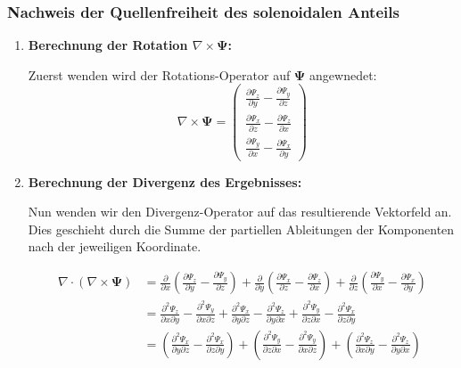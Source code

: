 \subsubsection{Nachweis der Quellenfreiheit des solenoidalen Anteils}

\begin{enumerate}
    \item \textbf{Berechnung der Rotation $\nabla \times \mathbf{\Psi}$:}
    
    Zuerst wenden wird der Rotations-Operator auf $\mathbf{\Psi}$ angewnedet:
    \[
    \nabla \times \mathbf{\Psi} =
    \begin{pmatrix}
        \frac{\partial \Psi_z}{\partial y} - \frac{\partial \Psi_y}{\partial z} \\
        \frac{\partial \Psi_x}{\partial z} - \frac{\partial \Psi_z}{\partial x} \\
        \frac{\partial \Psi_y}{\partial x} - \frac{\partial \Psi_x}{\partial y}
    \end{pmatrix}
    \]

    \item \textbf{Berechnung der Divergenz des Ergebnisses:}
    
    Nun wenden wir den Divergenz-Operator auf das resultierende Vektorfeld an. Dies geschieht durch die Summe der partiellen Ableitungen der Komponenten nach der jeweiligen Koordinate.
    
    \begin{align*}
    \nabla \cdot (\nabla \times \mathbf{\Psi}) &= \frac{\partial}{\partial x}\left( \frac{\partial \Psi_z}{\partial y} - \frac{\partial \Psi_y}{\partial z} \right) + \frac{\partial}{\partial y}\left( \frac{\partial \Psi_x}{\partial z} - \frac{\partial \Psi_z}{\partial x} \right) + \frac{\partial}{\partial z}\left( \frac{\partial \Psi_y}{\partial x} - \frac{\partial \Psi_x}{\partial y} \right) \\[1em]
    &= \frac{\partial^2 \Psi_z}{\partial x \partial y} - \frac{\partial^2 \Psi_y}{\partial x \partial z} + \frac{\partial^2 \Psi_x}{\partial y \partial z} - \frac{\partial^2 \Psi_z}{\partial y \partial x} + \frac{\partial^2 \Psi_y}{\partial z \partial x} - \frac{\partial^2 \Psi_x}{\partial z \partial y} \\[1em]
    &= \left( \frac{\partial^2 \Psi_x}{\partial y \partial z} - \frac{\partial^2 \Psi_x}{\partial z \partial y} \right) + \left( \frac{\partial^2 \Psi_y}{\partial z \partial x} - \frac{\partial^2 \Psi_y}{\partial x \partial z} \right) + \left( \frac{\partial^2 \Psi_z}{\partial x \partial y} - \frac{\partial^2 \Psi_z}{\partial y \partial x} \right)
    \end{align*}
    

\end{enumerate}

